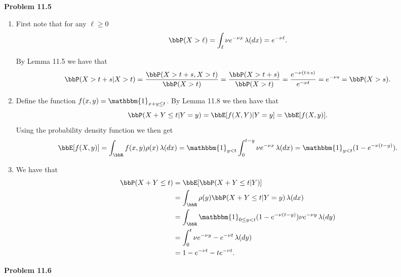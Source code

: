 \textbf{Problem 11.5}
\begin{enumerate}[label={(\alph*)}]
\item First note that for any $\ell \ge 0$ 
\[
	\bbP(X > \ell) = \int_{\ell} \nu e^{-\nu x} \, \lambda(dx) 
	= e^{-\nu \ell}.
\]

By Lemma 11.5 we have that
\[
	\bbP(X > t +s | X > t) = \frac{\bbP(X > t + s, X > t)}{\bbP(X > t)}
	= \frac{\bbP(X > t + s)}{\bbP(X > t)}
	= \frac{e^{-\nu(t + s)}}{e^{-\nu t}} = e^{-\nu s} = \bbP(X > s).
\]
\item Define the function $f(x,y) = \mathbbm{1}_{x + y \le t}$. By Lemma 11.8 we then have that
\[
	\bbP(X + Y \le t | Y = y) = \bbE[f(X,Y) | Y = y]
	= \bbE[f(X,y)].
\]
Using the probability density function we then get
\[
	\bbE[f(X,y)] = \int_{\bbR} f(x,y) \rho(x) \, \lambda(dx)
	= \mathbbm{1}_{y < t} \int_0^{t-y} \nu e^{-\nu x} \, \lambda(dx)
	= \mathbbm{1}_{y < t} (1 - e^{-\nu(t-y)}).
\]
\item We have that
\begin{align*}
	\bbP(X + Y \le t) &= \bbE[\bbP(X+Y \le t | Y)]\\
	&= \int_\bbR \rho(y) \bbP(X + Y \le t | Y = y) \, \lambda(dx)\\
	&= \int_\bbR \mathbbm{1}_{0 \le y < t} (1 - e^{-\nu(t-y)}) \nu e^{-\nu y} \, \lambda(dy) \\
	&= \int_0^t \nu e^{-\nu y} - e^{-\nu t} \, \lambda(dy) \\
	&= 1 - e^{-\nu t} - t e^{-\nu t}.
\end{align*}
\end{enumerate}


\bigskip

\textbf{Problem 11.6}

